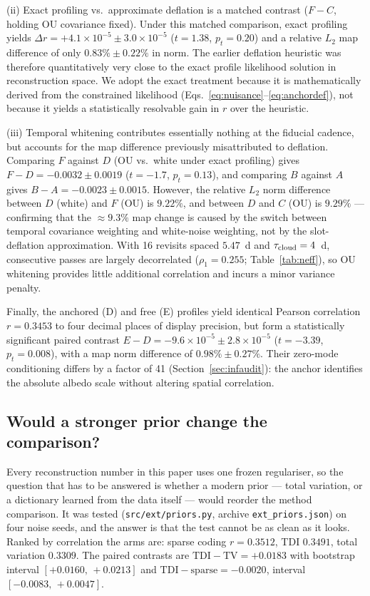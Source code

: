 \documentclass[twocolumn,10pt]{article}
\begin{document}
(ii) Exact profiling vs.\ approximate deflation is a matched contrast ($F - C$, holding OU covariance fixed). Under this matched comparison, exact profiling yields $\Delta r = +4.1\times10^{-5}\pm3.0\times10^{-5}$ ($t=1.38$, $p_t=0.20$) and a relative $L_2$ map difference of only $0.83\%\pm0.22\%$ in norm. The earlier deflation heuristic was therefore quantitatively very close to the exact profile likelihood solution in reconstruction space. We adopt the exact treatment because it is mathematically derived from the constrained likelihood (Eqs.~\ref{eq:nuisance}--\ref{eq:anchordef}), not because it yields a statistically resolvable gain in $r$ over the heuristic.

(iii) Temporal whitening contributes essentially nothing at the fiducial cadence, but accounts for the map difference previously misattributed to deflation. Comparing $F$ against $D$ (OU vs.\ white under exact profiling) gives $F-D = -0.0032\pm0.0019$ ($t=-1.7$, $p_t=0.13$), and comparing $B$ against $A$ gives $B-A = -0.0023\pm0.0015$. However, the relative $L_2$ norm difference between $D$ (white) and $F$ (OU) is $9.22\%$, and between $D$ and $C$ (OU) is $9.29\%$ --- confirming that the $\approx9.3\%$ map change is caused by the switch between temporal covariance weighting and white-noise weighting, not by the slot-deflation approximation. With 16 revisits spaced $5.47$~d and $\tau_{\rm cloud}=4$~d, consecutive passes are largely decorrelated ($\rho_1=0.255$; Table~\ref{tab:neff}), so OU whitening provides little additional correlation and incurs a minor variance penalty.

Finally, the anchored (D) and free (E) profiles yield identical Pearson correlation $r = 0.3453$ to four decimal places of display precision, but form a statistically significant paired contrast $E - D = -9.6\times10^{-5}\pm2.8\times10^{-5}$ ($t = -3.39$, $p_t = 0.008$), with a map norm difference of $0.98\%\pm0.27\%$. Their zero-mode conditioning differs by a factor of 41 (Section~\ref{sec:infaudit}): the anchor identifies the absolute albedo scale without altering spatial correlation.

\subsection{Would a stronger prior change the comparison?}
\label{sec:priors}
Every reconstruction number in this paper uses one frozen regulariser, so the
question that has to be answered is whether a modern prior --- total variation, or
a dictionary learned from the data itself --- would reorder the method
comparison. It was tested ({\tt src/ext/priors.py}, archive
{\tt ext\_priors.json}) on four noise seeds, and the answer is that the test
cannot be as clean as it looks. Ranked by correlation the arms are: sparse
coding $r=0.3512$, TDI $0.3491$, total variation $0.3309$. The paired contrasts
are $\mathrm{TDI}-\mathrm{TV}=+0.0183$ with bootstrap interval
$[+0.0160,\,+0.0213]$ and $\mathrm{TDI}-\mathrm{sparse}=-0.0020$, interval
$[-0.0083,\,+0.0047]$.
\end{document}
